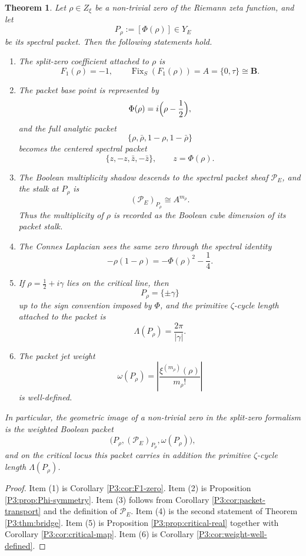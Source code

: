 \documentclass[11pt,a4paper]{article}
\numberwithin{equation}{section}
\newtheorem{theorem}{Theorem}[section]
\theoremstyle{definition}
\theoremstyle{remark}
\DeclareMathOperator{\Fix}{Fix}
\newcommand{\BB}{\mathbf B}
\newcommand{\cP}{\mathcal P}
\newcommand{\taup}{\tau}
\begin{document}
\begin{theorem}\label{P3:thm:main}
Let $\rho\in Z_\xi$ be a non-trivial zero of the Riemann zeta function, and let
\[
P_\rho:=[\Phi(\rho)]\in Y_E
\]
be its spectral packet.
Then the following statements hold.

\begin{enumerate}[label=(\arabic*)]
\item The split-zero coefficient attached to $\rho$ is
\[
F_1(\rho)=-1,
\qquad
\Fix_S(F_1(\rho))=A=\{0,\taup\}\cong\BB.
\]

\item The packet base point is represented by
\[
\Phi(\rho)=i\Bigl(\rho-\frac12\Bigr),
\]
and the full analytic packet
\[
\{\rho,\bar\rho,1-\rho,1-\bar\rho\}
\]
becomes the centered spectral packet
\[
\{z,-z,\bar z,-\bar z\},
\qquad z=\Phi(\rho).
\]

\item The Boolean multiplicity shadow descends to the spectral packet sheaf $\cP_E$, and the stalk at $P_\rho$ is
\[
(\cP_E)_{P_\rho}\cong A^{m_\rho}.
\]
Thus the multiplicity of $\rho$ is recorded as the Boolean cube dimension of its packet stalk.

\item The Connes Laplacian sees the same zero through the spectral identity
\[
-\rho(1-\rho)=-\Phi(\rho)^2-\frac14.
\]

\item If $\rho=\frac12+i\gamma$ lies on the critical line, then
\[
P_\rho=\{\pm\gamma\}
\]
up to the sign convention imposed by $\Phi$, and the primitive $\zeta$-cycle length attached to the packet is
\[
\Lambda(P_\rho)=\frac{2\pi}{|\gamma|}.
\]

\item The packet jet weight
\[
\omega(P_\rho)=\left|\frac{\xi^{(m_\rho)}(\rho)}{m_\rho!}\right|
\]
is well-defined.
\end{enumerate}

In particular, the geometric image of a non-trivial zero in the split-zero formalism is the weighted Boolean packet
\[
\bigl(P_\rho,(\cP_E)_{P_\rho},\omega(P_\rho)\bigr),
\]
and on the critical locus this packet carries in addition the primitive $\zeta$-cycle length $\Lambda(P_\rho)$.
\end{theorem}

\begin{proof}
Item (1) is Corollary \ref{P3:cor:F1-zero}.  Item (2) is Proposition \ref{P3:prop:Phi-symmetry}.  Item (3) follows from Corollary \ref{P3:cor:packet-transport} and the definition of $\cP_E$.  Item (4) is the second statement of Theorem \ref{P3:thm:bridge}.  Item (5) is Proposition \ref{P3:prop:critical-real} together with Corollary \ref{P3:cor:critical-map}.  Item (6) is Corollary \ref{P3:cor:weight-well-defined}.
\end{proof}
\end{document}
